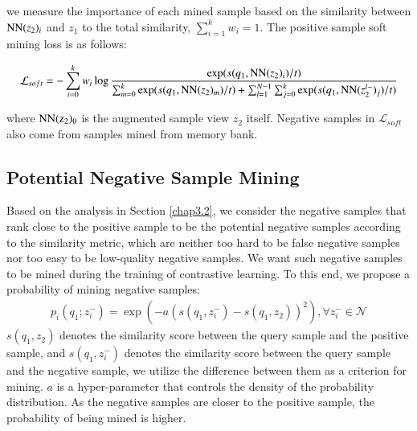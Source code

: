 \documentclass[review]{elsarticle}
\begin{document}
we measure the importance of each mined sample based on the similarity between ${\rm NN}(z_2)_i$ and $z_1$ to the total similarity, $\sum_{i=1}^{k}w_i =1$. The positive sample soft mining loss is as follows:
\begin{footnotesize}
\begin{equation}
\begin{aligned}
\mathcal{L} _{soft}= 
 -\sum_{i=0}^{k}w_i\log \frac{  \exp(s( q_1,{\rm NN}(z_2)_i)/t )           }    { \sum_{m=0}^{k}\exp(s( q_1,{\rm NN}(z_2)_m)/t )
     +\sum_{l=1}^{N-1}\sum_{j=0}^{k}\exp(s( q_1,{\rm NN}(z_2^{l-})_j)/t )}   
     \label{equation6}
\end{aligned}
\end{equation}
\end{footnotesize}where $\rm NN(z_2)_0$ is the augmented sample view $z_2$ itself. Negative samples in $\mathcal{L} _{soft}$ also come from samples mined from memory bank.



\subsection{Potential Negative Sample Mining}
Based on the analysis in Section \ref{chap3.2},  we consider the negative samples that rank close to the positive sample to be the potential negative samples according to the similarity metric, which are neither too hard to be false negative samples nor too easy to be low-quality negative samples. We want such negative samples to be mined during the training of contrastive learning. To this end, we propose a probability of mining negative samples: 
\begin{equation}
\begin{aligned}
p_i(q_1;z_i^{-})=\exp(-a(s(q_1,z_i^{-})-s(q_1,z_2))^{2}),\forall z_i^{-} \in \mathcal{N} 
     \label{equation8}
\end{aligned}
\end{equation}
$s(q_1,z_2)$ denotes the similarity score between the query sample and the positive sample, and $s(q_1,z_i^{-})$ denotes the similarity score between the query sample and the negative sample, we utilize the difference between them as a criterion for mining. $a$ is a hyper-parameter that controls the density of the probability distribution. As the negative samples are closer to the positive sample, the probability of being mined is higher.
\end{document}
